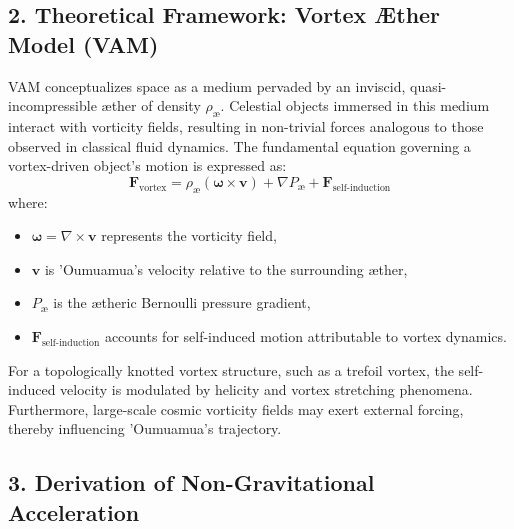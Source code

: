     \subsection*{2. Theoretical Framework: Vortex Æther Model (VAM)}
    VAM conceptualizes space as a medium pervaded by an inviscid, quasi-incompressible æther of density $\rho_\text{\ae}$. Celestial objects immersed in this medium interact with vorticity fields, resulting in non-trivial forces analogous to those observed in classical fluid dynamics. The fundamental equation governing a vortex-driven object's motion is expressed as:
    \begin{equation*}
        \mathbf{F}_\text{vortex} = \rho_\text{\ae} (\mathbf{\omega} \times \mathbf{v}) + \nabla P_\text{\ae} + \mathbf{F}_\text{self-induction}
    \end{equation*}
    where:
    \begin{itemize}
        \item $\mathbf{\omega} = \nabla \times \mathbf{v}$ represents the vorticity field,
        \item $\mathbf{v}$ is 'Oumuamua's velocity relative to the surrounding æther,
        \item $P_\text{\ae}$ is the ætheric Bernoulli pressure gradient,
        \item $\mathbf{F}_\text{self-induction}$ accounts for self-induced motion attributable to vortex dynamics.
    \end{itemize}
    For a topologically knotted vortex structure, such as a trefoil vortex, the self-induced velocity is modulated by helicity and vortex stretching phenomena. Furthermore, large-scale cosmic vorticity fields may exert external forcing, thereby influencing 'Oumuamua's trajectory.

    \subsection*{3. Derivation of Non-Gravitational Acceleration}

